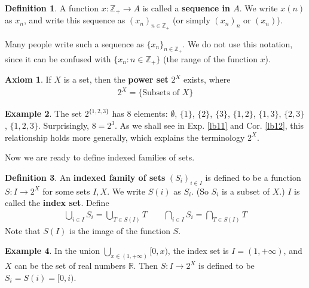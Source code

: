\documentclass[12pt,b5paper,notitlepage]{article}
\theoremstyle{definition}
\newtheorem{df}{Definition}[section]
\newtheorem{eg}[df]{Example}
\newtheorem*{axiom}{Axiom}
\theoremstyle{plain}
\newcommand{\Zbb}{\mathbb Z}
\newcommand{\Rbb}{\mathbb R}
\numberwithin{equation}{section}
\begin{document}
\begin{df}\label{lb13}
A function $x:\Zbb_+\rightarrow A$ is called a \textbf{sequence in $A$}. We write $x(n)$ as $x_n$, and write this sequence as $(x_n)_{n\in\Zbb_+}$ (or simply $(x_n)_n$ or $(x_n)$).
\end{df}

Many people write such a sequence as $\{x_n\}_{n\in\Zbb_+}$. We do not use this notation, since it can be confused with $\{x_n: n\in\Zbb_+\}$ (the range of the function $x$).



\begin{axiom}
If $X$ is a set, then the \textbf{power set}  $2^X$ exists, where
\begin{align*}
2^X=\{\text{Subsets of }X\}
\end{align*}
\end{axiom}

\begin{eg}
The set $2^{\{1,2,3\}}$ has $8$ elements: $\emptyset$, $\{1\}$, $\{2\}$, $\{3\}$, $\{1,2\}$, $\{1,3\}$, $\{2,3\}$, $\{1,2,3\}$. Surprisingly, $8=2^3$. As we shall see in Exp. \ref{lb11} and Cor. \ref{lb12}, this relationship holds more generally, which explains the terminology $2^X$.  
\end{eg}

Now we are ready to define indexed families of sets.
\begin{df}\label{lb1}
An \textbf{indexed family of sets}   $(S_i)_{i\in I}$ is defined to be a function $S:I\rightarrow 2^X$ for some sets $I,X$. We write $S(i)$ as $S_i$. (So $S_i$ is a subset of $X$.) $I$ is called the \textbf{index set}. Define
\begin{align*}
\bigcup_{i\in I}S_i= \bigcup_{T\in S(I)}T\qquad \bigcap_{i\in I}S_i= \bigcap_{T\in S(I)}T
\end{align*}
Note that $S(I)$ is the image of the function $S$.
\end{df}


\begin{eg}
In the union $\bigcup_{x\in(1,+\infty)}[0,x)$, the index set is $I=(1,+\infty)$, and $X$ can be the set of real numbers $\Rbb$. Then $S:I\rightarrow 2^X$ is defined to be $S_i=S(i)=[0,i)$.
\end{eg}
\end{document}
